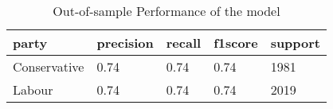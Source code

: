 \begin{table}[!htb]
\centering
\caption{Out-of-sample Performance of the model} 
\label{tab:text_validation}
\begin{tabular}{lllll}
  \hline
party & precision & recall & f1score & support \\ 
  \hline
Conservative & 0.74 & 0.74 & 0.74 & 1981 \\ 
  Labour & 0.74 & 0.74 & 0.74 & 2019 \\ 
   \hline
\end{tabular}
\end{table}
